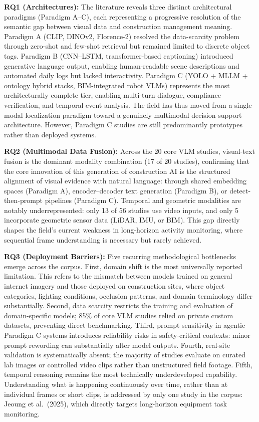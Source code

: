 \documentclass[10pt,letterpaper]{article}
\begin{document}
\textbf{RQ1 (Architectures):} The literature reveals three distinct architectural paradigms (Paradigm A--C), each representing a progressive resolution of the semantic gap between visual data and construction management meaning. Paradigm A (CLIP, DINOv2, Florence-2) resolved the data-scarcity problem through zero-shot and few-shot retrieval but remained limited to discrete object tags. Paradigm B (CNN--LSTM, transformer-based captioning) introduced generative language output, enabling human-readable scene descriptions and automated daily logs but lacked interactivity. Paradigm C (YOLO + MLLM + ontology hybrid stacks, BIM-integrated robot VLMs) represents the most architecturally complete tier, enabling multi-turn dialogue, compliance verification, and temporal event analysis. The field has thus moved from a single-modal localization paradigm toward a genuinely multimodal decision-support architecture. However, Paradigm C studies are still predominantly prototypes rather than deployed systems.

\textbf{RQ2 (Multimodal Data Fusion):} Across the 20 core VLM studies, visual-text fusion is the dominant modality combination (17 of 20 studies), confirming that the core innovation of this generation of construction AI is the structured alignment of visual evidence with natural language: through shared embedding spaces (Paradigm A), encoder--decoder text generation (Paradigm B), or detect-then-prompt pipelines (Paradigm C). Temporal and geometric modalities are notably underrepresented: only 13 of 56 studies use video inputs, and only 5 incorporate geometric sensor data (LiDAR, IMU, or BIM). This gap directly shapes the field's current weakness in long-horizon activity monitoring, where sequential frame understanding is necessary but rarely achieved.

\textbf{RQ3 (Deployment Barriers):} Five recurring methodological bottlenecks emerge across the corpus. First, domain shift is the most universally reported limitation. This refers to the mismatch between models trained on general internet imagery and those deployed on construction sites, where object categories, lighting conditions, occlusion patterns, and domain terminology differ substantially. Second, data scarcity restricts the training and evaluation of domain-specific models; 85\% of core VLM studies relied on private custom datasets, preventing direct benchmarking. Third, prompt sensitivity in agentic Paradigm C systems introduces reliability risks in safety-critical contexts: minor prompt rewording can substantially alter model outputs. Fourth, real-site validation is systematically absent; the majority of studies evaluate on curated lab images or controlled video clips rather than unstructured field footage. Fifth, temporal reasoning remains the most technically underdeveloped capability. Understanding what is happening continuously over time, rather than at individual frames or short clips, is addressed by only one study in the corpus: Jeoung et al.\ (2025), which directly targets long-horizon equipment task monitoring.
\end{document}
